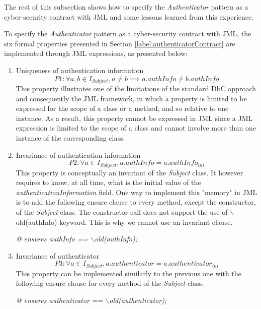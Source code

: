 The rest of this subsection shows how to specify the \textit{Authenticator} pattern as a cyber-security contract with JML and some lessons learned from this experience. 

To specify the \textit{Authenticator} pattern as a cyber-security contract with JML, the six formal properties presented in Section \ref{label:authenticatorContract} are implemented through JML expressions, as presented below:
\begin{enumerate}
    \item Uniqueness of authentication information
    \begin{equation*}
        P1: \forall a, b \in I_{Subject},a \ne b \implies a.authInfo  \ne b.authInfo 
    \end{equation*}
    This property illustrates one of the limitations of the standard DbC approach and consequently the JML framework, in which a property is limited to be expressed for the scope of a class or a method, and so relative to one instance. As a result, this property cannot be expressed in JML since a JML expression is limited to the scope of a class and cannot involve more than one instance of the corresponding class.
    
    \item Invariance of authentication information
    \begin{equation*}
        P2: \forall a \in I_{Subject}, a.authInfo = a.authInfo_{ini}
    \end{equation*}
    This property is conceptually an invariant of the \textit{Subject} class. It however requires to know, at all time, what is the initial value of the \textit{authenticationInformation} field. One way to implement this "memory" in JML is to add the following ensure clause to every method, except the constructor, of the \textit{Subject} class. The constructor call does not support the use of $\backslash$old(authInfo) keyword. This is why we cannot use an invariant clause.
    \begin{center}
        \textit{@ ensures authInfo == $\backslash$old(authInfo);}
    \end{center}
    
    \item Invariance of authenticator
    \begin{equation*}
        P3: \forall a \in I_{Subject}, a.authenticator = a.authenticator_{ini}
    \end{equation*}
    This property can be implemented similarly to the previous one with the following ensure clause for every method of the \textit{Subject} class.
    \begin{center}
        \textit{@ ensures authenticator == $\backslash$old(authenticator);}
    \end{center}
    

\end{enumerate}
